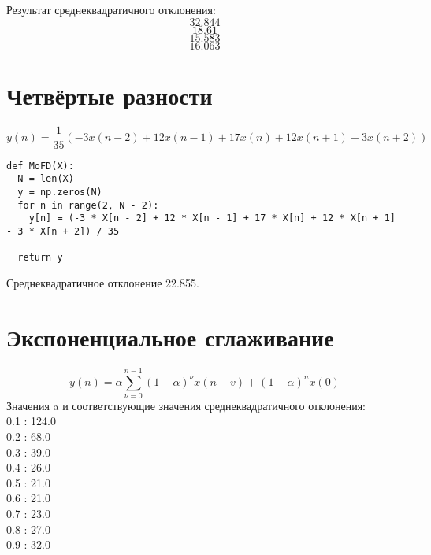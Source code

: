 \documentclass[12pt]{article}
\begin{document}
\begin{figure}[!htb]
\centering
\caption{}
\label{}
\end{figure}

Результат среднеквадратичного отклонения:
\[ 32.844\]
\[ 18.61\]
\[ 15.583\]
\[ 16.063\]

       

\section{Четвёртые разности}

\[y(n) = \frac{1}{35}(-3x(n-2) + 12x(n-1) + 17x(n) + 12x(n+1) - 3x(n+2)) \]


\begin{lstlisting}
def MoFD(X):
  N = len(X)
  y = np.zeros(N)
  for n in range(2, N - 2):
    y[n] = (-3 * X[n - 2] + 12 * X[n - 1] + 17 * X[n] + 12 * X[n + 1] - 3 * X[n + 2]) / 35

  return y
\end{lstlisting}

Среднеквадратичное отклонение 22.855.

\begin{figure}[!htb]
\centering
\caption{}
\label{}


\end{figure}

\section{Экспоненциальное сглаживание}
\[y(n) = \alpha \sum_{\nu=0}^{n-1}(1-\alpha)^\nu x(n-v) + (1 - \alpha)^n x(0) \]
Значения a и соответствующие значения среднеквадратичного отклонения: \\
0.1 : 124.0\\
0.2 : 68.0\\
0.3 : 39.0\\
0.4 : 26.0\\
0.5 : 21.0\\
0.6 : 21.0\\
0.7 : 23.0\\
0.8 : 27.0\\
0.9 : 32.0\\
\begin{figure}[htp]
\centering
\caption{}
\label{}
\end{figure}
\end{document}
